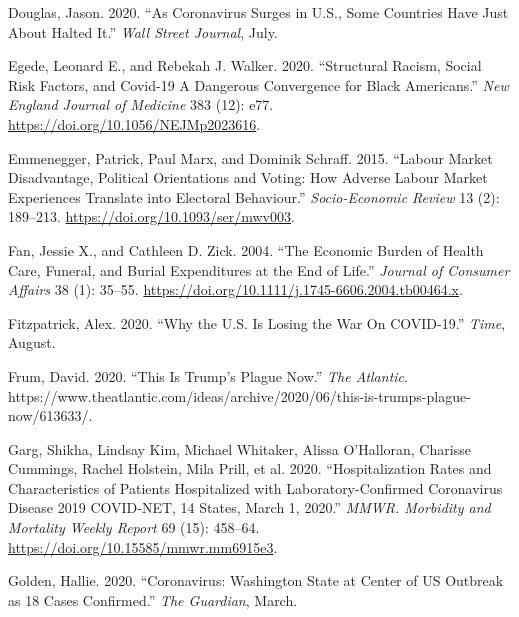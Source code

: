 \documentclass[
  12pt,
]{article}
\newlength{\cslhangindent}
\newlength{\cslentryspacingunit} %
\newenvironment{CSLReferences}[2] %
 {%
  \setlength{\parindent}{0pt}
  \ifodd #1
  \let\oldpar\par
  \def\par{\hangindent=\cslhangindent\oldpar}
  \fi
  \setlength{\parskip}{#2\cslentryspacingunit}
 }%
 {}
\begin{document}
\begin{CSLReferences}{1}{0}
\leavevmode{}%
Douglas, Jason. 2020. {``As {Coronavirus Surges} in {U}.{S}., {Some Countries Have Just About Halted It}.''} \emph{Wall Street Journal}, July.

\leavevmode{}%
Egede, Leonard E., and Rebekah J. Walker. 2020. {``Structural {Racism}, {Social Risk Factors}, and {Covid-19} \textemdash{} {A Dangerous Convergence} for {Black Americans}.''} \emph{New England Journal of Medicine} 383 (12): e77. \url{https://doi.org/10.1056/NEJMp2023616}.

\leavevmode{}%
Emmenegger, Patrick, Paul Marx, and Dominik Schraff. 2015. {``Labour Market Disadvantage, Political Orientations and Voting: How Adverse Labour Market Experiences Translate into Electoral Behaviour.''} \emph{Socio-Economic Review} 13 (2): 189--213. \url{https://doi.org/10.1093/ser/mwv003}.

\leavevmode{}%
Fan, Jessie X., and Cathleen D. Zick. 2004. {``The {Economic Burden} of {Health Care}, {Funeral}, and {Burial Expenditures} at the {End} of {Life}.''} \emph{Journal of Consumer Affairs} 38 (1): 35--55. \url{https://doi.org/10.1111/j.1745-6606.2004.tb00464.x}.

\leavevmode{}%
Fitzpatrick, Alex. 2020. {``Why the {U}.{S}. {Is Losing} the {War On COVID-19}.''} \emph{Time}, August.

\leavevmode{}%
Frum, David. 2020. {``This {Is Trump}'s {Plague Now}.''} \emph{The Atlantic}. https://www.theatlantic.com/ideas/archive/2020/06/this-is-trumps-plague-now/613633/.

\leavevmode{}%
Garg, Shikha, Lindsay Kim, Michael Whitaker, Alissa O'Halloran, Charisse Cummings, Rachel Holstein, Mila Prill, et al. 2020. {``Hospitalization {Rates} and {Characteristics} of {Patients Hospitalized} with {Laboratory-Confirmed Coronavirus Disease} 2019 \textemdash{} {COVID-NET}, 14 {States}, {March} 1, 2020.''} \emph{MMWR. Morbidity and Mortality Weekly Report} 69 (15): 458--64. \url{https://doi.org/10.15585/mmwr.mm6915e3}.

\leavevmode{}%
Golden, Hallie. 2020. {``Coronavirus: {Washington} State at Center of {US} Outbreak as 18 Cases Confirmed.''} \emph{The Guardian}, March.


\end{CSLReferences}
\end{document}
